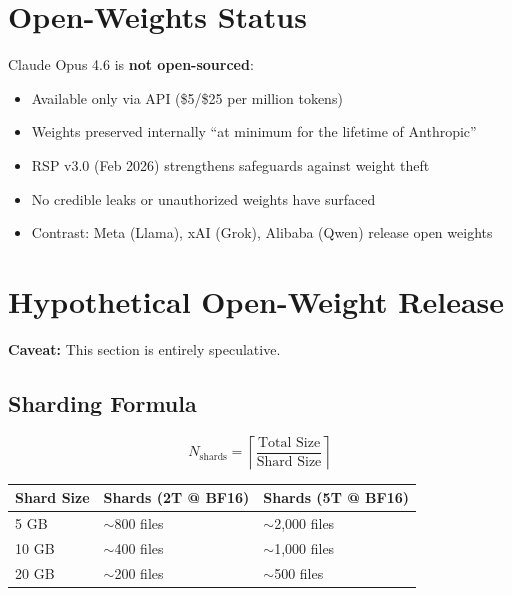\documentclass[11pt,a4paper]{article}
\begin{document}
\section{Open-Weights Status}

Claude Opus 4.6 is \textbf{not open-sourced}:

\begin{itemize}
  \item Available only via API (\$5/\$25 per million tokens)
  \item Weights preserved internally ``at minimum for the lifetime of Anthropic''
  \item RSP v3.0 (Feb 2026) strengthens safeguards against weight theft
  \item No credible leaks or unauthorized weights have surfaced
  \item Contrast: Meta (Llama), xAI (Grok), Alibaba (Qwen) release open weights
\end{itemize}

\section{Hypothetical Open-Weight Release}

\begin{tcolorbox}[colback=blue!5, colframe=blue!50!black]
\textbf{Caveat:} This section is entirely speculative.
\end{tcolorbox}

\subsection{Sharding Formula}

$$N_{\text{shards}} = \left\lceil \frac{\text{Total Size}}{\text{Shard Size}} \right\rceil$$

\begin{center}
\begin{tabular}{lll}
\toprule
\textbf{Shard Size} & \textbf{Shards (2T @ BF16)} & \textbf{Shards (5T @ BF16)} \\
\midrule
5 GB & $\sim$800 files & $\sim$2,000 files \\
10 GB & $\sim$400 files & $\sim$1,000 files \\
20 GB & $\sim$200 files & $\sim$500 files \\
\bottomrule
\end{tabular}
\end{center}
\end{document}
